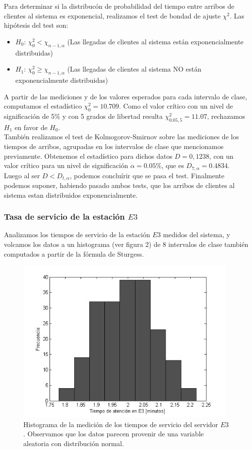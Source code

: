 \documentclass{article}
\numberwithin{equation}{section}
\numberwithin{figure}{section}
\numberwithin{table}{section}
\begin{document}
Para determinar si la distribuc\'on de probabilidad del tiempo entre arribos
de clientes al sistema es exponencial, realizamos el test de bondad de ajuste
$\chi^2$. Las hip\'otesis del test son:

\begin{itemize}
 \item {$H_{0}$:} $\chi_{0}^2 < \chi_{n-1,\alpha}$ (Las llegadas de clientes al sistema est\'an exponencialmente distribuidas)
 \item {$H_{1}$:} $\chi_{0}^2 \ge \chi_{n-1,\alpha}$ (Las llegadas de clientes al sistema NO est\'an exponencialmente distribuidas)
\end{itemize}

A partir de las mediciones y de los valores esperados para cada
intervalo de clase, computamos el estad\'istico $\chi_{0}^2 = 10.709$. Como el valor
cr\'itico con un nivel de significaci\'on de 5\% y con 5 grados de libertad resulta 
$\chi_{0.05,5}^2 = 11.07$, rechazamos $H_1$ en favor de $H_0$.\\
Tambi\'en realizamos el test de Kolmogorov-Smirnov sobre las mediciones de los tiempos de arribos, agrupadas en los intervalos 
de clase que mencionamos previamente. Obtenemos el estad\'istico para dichos datos $D =  0,1238$, con un valor cr\'itico para un nivel
de significaci\'on $\alpha = 0.05 \% $, que es  $D_{7,\alpha} = 0.4834$. Luego al ser $D < D_{t, \alpha }$, podemos conclu\'irir que se pasa el test.
Finalmente podemos suponer, habiendo pasado ambos tests, que los arribos de clientes al sistema estan distribuidos exponencialmente.

\subsubsection*{Tasa de servicio de la estaci\'on $E3$}
Analizamos los tiempos de servicio de la estaci\'on $E3$ medidos del sistema, y volcamos
los datos a un histograma (ver figura 2) de 8 intervalos de clase tambi\'en computados
a partir de la f\'ormula de Sturgess.

\begin{figure}
\begin{center}
\includegraphics[width=11cm]{histograma_e3}
\caption{Histograma de la medici\'on de los tiempos de servicio del servidor $E3$. Observamos que los datos parecen provenir de una variable aleatoria con distribuci\'on normal.}
\end{center}
\end{figure}
\end{document}

